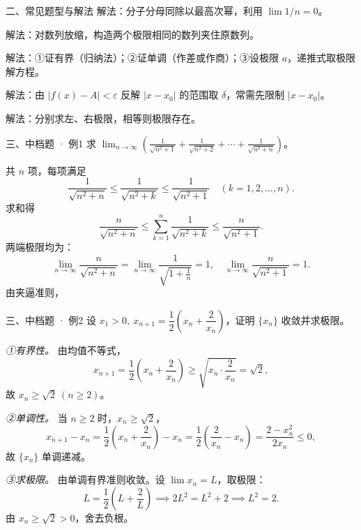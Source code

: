 \documentclass[aspectratio=169,11pt]{beamer}
\begin{document}
\begin{frame}{二、常见题型与解法}
解法：分子分母同除以最高次幂，利用 $\lim 1/n=0$。

解法：对数列放缩，构造两个极限相同的数列夹住原数列。

解法：①证有界（归纳法）；②证单调（作差或作商）；③设极限 $a$，递推式取极限解方程。

解法：由 $|f(x)-A|<\varepsilon$ 反解 $|x-x_0|$ 的范围取 $\delta$，常需先限制 $|x-x_0|$。

解法：分别求左、右极限，相等则极限存在。
\end{frame}

\begin{frame}{三、中档题 · 例1}
 求 $\displaystyle\lim_{n\to\infty}\left(\frac1{\sqrt{n^2+1}}+\frac1{\sqrt{n^2+2}}+\cdots+\frac1{\sqrt{n^2+n}}\right)$。

 共 $n$ 项，每项满足
\[
\frac1{\sqrt{n^2+n}}\le \frac1{\sqrt{n^2+k}}\le \frac1{\sqrt{n^2+1}}\quad (k=1,2,\dots,n).
\]
求和得
\[
\frac{n}{\sqrt{n^2+n}}\le \sum_{k=1}^n\frac1{\sqrt{n^2+k}}\le \frac{n}{\sqrt{n^2+1}}.
\]
两端极限均为：
\[
\lim_{n\to\infty}\frac{n}{\sqrt{n^2+n}}=\lim_{n\to\infty}\frac{1}{\sqrt{1+\frac1n}}=1,
\quad
\lim_{n\to\infty}\frac{n}{\sqrt{n^2+1}}=1.
\]
由夹逼准则，

\end{frame}

\begin{frame}{三、中档题 · 例2}
 设 $x_1>0,\ x_{n+1}=\dfrac12\left(x_n+\dfrac{2}{x_n}\right)$，证明 $\{x_n\}$ 收敛并求极限。

\emph{①有界性。} 由均值不等式，
\[
x_{n+1}=\frac12\left(x_n+\frac{2}{x_n}\right)\ge \sqrt{x_n\cdot\frac{2}{x_n}}=\sqrt2,
\]
故 $x_n\ge\sqrt2\ (n\ge 2)$。

\emph{②单调性。} 当 $n\ge 2$ 时，$x_n\ge\sqrt2$，
\[
x_{n+1}-x_n=\frac12\left(x_n+\frac{2}{x_n}\right)-x_n=\frac12\left(\frac{2}{x_n}-x_n\right)=\frac{2-x_n^2}{2x_n}\le 0,
\]
故 $\{x_n\}$ 单调递减。

\emph{③求极限。} 由单调有界准则收敛。设 $\lim x_n=L$，取极限：
\[
L=\frac12\left(L+\frac{2}{L}\right)\implies 2L^2=L^2+2\implies L^2=2.
\]
由 $x_n\ge\sqrt2>0$，舍去负根。

\end{frame}
\end{document}

